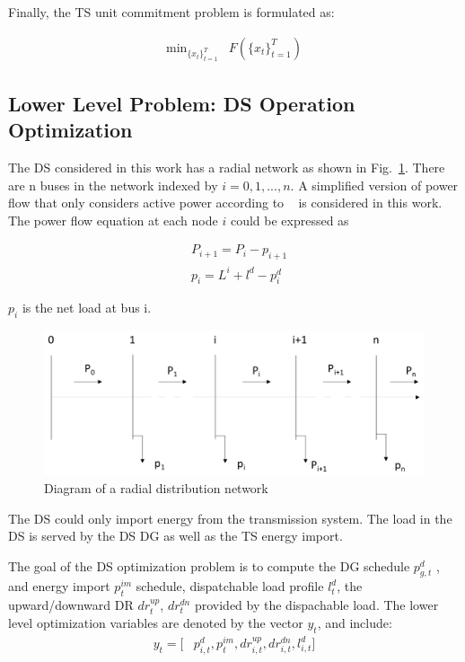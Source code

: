 Finally, the TS unit commitment problem is formulated as: 

\begin{align}
\text{min}_{\{x_t\}^{T}_{t=1}} & F\left(\{x_t\}^{T}_{t=1}\right)\nonumber
\end{align}

\subsection{Lower Level Problem: DS Operation Optimization}
The DS considered in this work has a radial network as shown in Fig.~\ref{pf}. There are n buses in the network indexed by $i = 0,1,..., n.$ A simplified version of power flow that only considers active power according to ~\cite{dpf} is considered in this work. The power flow equation at each node $i$ could be expressed as

\begin{align}
& P_{i+1} = P_i - p_{i+1}\nonumber \\
& p_{i} =  L^i_{} + l^d_{} - p^d_{i} \nonumber 
\end{align}

$p_{i}$ is the net load at bus i. 

\begin{figure}
\centering
\includegraphics[scale=0.2]{pfs.png}
\caption{Diagram of a radial distribution network}
\label{pf}
\end{figure}

The DS could only import energy from the transmission system. The load in the DS is served by the DS DG as well as the TS energy import.


The goal of the DS optimization problem is to compute the DG schedule $p^d_{g,t}$ , and  energy import $p^{im}_{t}$ schedule, dispatchable load profile $l^d_{t}$, the upward/downward  DR $dr_{t}^{up}$, $dr_{t}^{dn}$ provided by the dispachable load. The lower level optimization variables are denoted by the vector $y_t$, and include:
\begin{align*}
y_t=[&p^d_{i,t}, p^{im}_{t}, dr_{i,t}^{up},dr_{i,t}^{dn},l^d_{i,t}]
\end{align*} 

